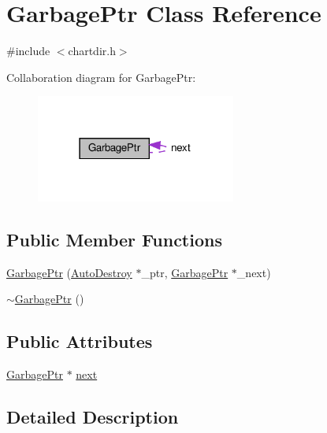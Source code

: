 \hypertarget{class_garbage_ptr}{}\section{Garbage\+Ptr Class Reference}
\label{class_garbage_ptr}


{\ttfamily \#include $<$chartdir.\+h$>$}



Collaboration diagram for Garbage\+Ptr\+:
\nopagebreak
\begin{figure}[H]
\begin{center}
\leavevmode
\includegraphics[width=186pt]{class_garbage_ptr__coll__graph}
\end{center}
\end{figure}
\subsection*{Public Member Functions}
\begin{DoxyCompactItemize}
\item 
\hyperlink{class_garbage_ptr_ad2798acd0926c686a0f5a6750312b09d}{Garbage\+Ptr} (\hyperlink{class_auto_destroy}{Auto\+Destroy} $\ast$\+\_\+ptr, \hyperlink{class_garbage_ptr}{Garbage\+Ptr} $\ast$\+\_\+next)
\item 
\hyperlink{class_garbage_ptr_a6f930c08dcb1c57cbc0f08b8630048b0}{$\sim$\+Garbage\+Ptr} ()
\end{DoxyCompactItemize}
\subsection*{Public Attributes}
\begin{DoxyCompactItemize}
\item 
\hyperlink{class_garbage_ptr}{Garbage\+Ptr} $\ast$ \hyperlink{class_garbage_ptr_a56ec304006d756b7de706f398aafb971}{next}
\end{DoxyCompactItemize}


\subsection{Detailed Description}


